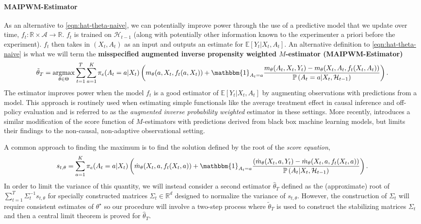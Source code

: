 \documentclass[11pt]{article}
\newcommand{\E}{\mathbb{E}}
\newcommand{\R}{\mathbb{R}}
\DeclareMathOperator*{\argmax}{argmax}
\begin{document}
\paragraph{MAIPWM-Estimator} As an alternative to \cref{eqn:hat-theta-naive}, we can potentially improve power through the use of a predictive model that we update over time, $f_{t} : \R  \times \mathcal{A}  \rightarrow \R$. $f_{t}$ is trained on $\mathcal{H}_{t-1}$ (along with potentially other information known to the experimenter a priori before the experiment). $f_{t}$ then takes in $(X_{t},A_{t})$ as an input and outputs an estimate for $  \E\left[ Y_{t} | X_{t},A_{t}\right]$. An alternative definition to  \cref{eqn:hat-theta-naive} is what we will term the \textbf{misspecified augmented inverse propensity weighted $M$-estimator (MAIPWM-Estimator)} 
\begin{equation} \label{eqn:hat_theta}
\tilde{\theta}_{T} = \argmax_{\theta \in \Theta}  \sum_{t=1}^{T} \sum_{a=1}^{K} \pi_{e}(A_{t} =a | X_{t}) \left( m_{\theta}(a,X_{t},f_{t}(a,X_{t}))   + \mathbbm{1}_{A_{t} = a} \frac{ m_{\theta}(A_{t},X_{t},Y_{t})  -  m_{\theta}(X_{t},A_{t},f_{t}(X_{t},A_{t})) }{ \mathbb{P} \left(A_{t} =a | X_{t},\mathcal{H}_{t-1} \right)  }\right).
\end{equation}
The estimator improves power when the model $f_{t}$ is a good estimator of $\E[Y_{t} | X_t,A_t]$
by augmenting observations with predictions from a model. This approach is routinely used when estimating simple functionals like the average treatment effect in causal inference \citep{10.1111/ectj.12097} and off-policy evaluation \citep{doi:10.1073/pnas.2014602118} and is referred to as the \emph{augmented inverse probability weighted} estimator in these settings. More recently, \cite{zrnic2024active} introduces a similar modification of the score function of $M$-estimators with predictions derived from black box machine learning models, but limits their findings to the non-causal, non-adaptive observational setting. 

A common approach to finding the maximum is to find the solution defined by the root of the \emph{score equation}, 
\begin{equation} \label{eqn:score}
s_{t,\theta} = \sum_{a=1}^{K} \pi_{e}(A_{t} =a | X_{t}) \left( \dot{m}_{\theta}(X_{t},a,f_{t}(X_{t},a))   + \mathbbm{1}_{A_{t}=a}\frac{ \left( \dot{m}_{\theta}(X_{t},a,Y_{t})  -  \dot{m}_{\theta}(X_{t},a,f_{t}(X_{t},a) \right)}{ \mathbb{P} \left(A_{t}| X_{t}, \mathcal{H}_{t-1} \right)  }\right).
\end{equation}
In order to limit the variance of this quantity, we will instead consider a second estimator $\hat{\theta}_{T}$ defined as the (approximate) root of $\sum_{t=1}^{T} \Sigma_{t}^{-1} s_{t,\theta}$ for specially constructed matrices $\Sigma_t \in \R^{d}$ designed to normalize the variance of $s_{t,\theta}$. However, the construction of $\Sigma_t$ will require consistent estimates of $\theta^{\star}$ so our procedure will involve a two-step process where $\tilde{\theta}_{T}$ is used to construct the stabilizing matrices $\Sigma_t$ and then a central limit theorem is proved for $\hat{\theta}_{T}$.
\end{document}
